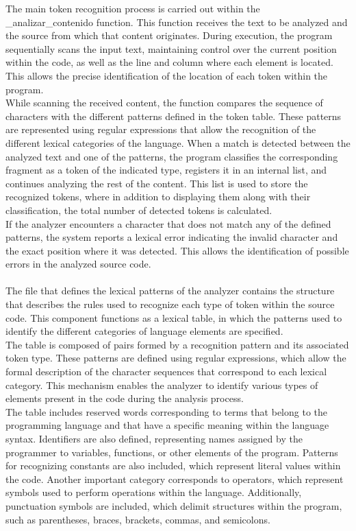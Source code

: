 \documentclass[letterpaper,12pt,oneside]{article}
\begin{document}
The main token recognition process is carried out within the \_analizar\_contenido function. This function receives the text to be analyzed and the source from which that content originates. During execution, the program sequentially scans the input text, maintaining control over the current position within the code, as well as the line and column where each element is located. This allows the precise identification of the location of each token within the program. \\
While scanning the received content, the function compares the sequence of characters with the different patterns defined in the token table. These patterns are represented using regular expressions that allow the recognition of the different lexical categories of the language. When a match is detected between the analyzed text and one of the patterns, the program classifies the corresponding fragment as a token of the indicated type, registers it in an internal list, and continues analyzing the rest of the content. This list is used to store the recognized tokens, where in addition to displaying them along with their classification, the total number of detected tokens is calculated. \\
If the analyzer encounters a character that does not match any of the defined patterns, the system reports a lexical error indicating the invalid character and the exact position where it was detected. This allows the identification of possible errors in the analyzed source code. \\ \\
The file that defines the lexical patterns of the analyzer contains the structure that describes the rules used to recognize each type of token within the source code. This component functions as a lexical table, in which the patterns used to identify the different categories of language elements are specified. \\
The table is composed of pairs formed by a recognition pattern and its associated token type. These patterns are defined using regular expressions, which allow the formal description of the character sequences that correspond to each lexical category. This mechanism enables the analyzer to identify various types of elements present in the code during the analysis process. \\
The table includes reserved words corresponding to terms that belong to the programming language and that have a specific meaning within the language syntax. Identifiers are also defined, representing names assigned by the programmer to variables, functions, or other elements of the program. Patterns for recognizing constants are also included, which represent literal values within the code. Another important category corresponds to operators, which represent symbols used to perform operations within the language. Additionally, punctuation symbols are included, which delimit structures within the program, such as parentheses, braces, brackets, commas, and semicolons.
\end{document}

